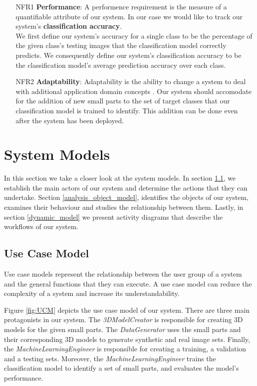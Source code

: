 \begin{itemize}
  \item [NFR1] \textbf{Performance}: A performence requirement is the measure of a quantifiable attribute of our system. In our case we would like to track our system's \textbf{classification accuracy}.
  \\We first define our system's accuracy for a single class to be the percentage of the given class's testing images that the classification model correctly predicts. We consequently define our system's classification accuracy to be the classification model's average prediction accuracy over each class.

  \item [NFR2] \textbf{Adaptability}: Adaptability is the ability to change a system to deal with additional application domain concepts \cite{bruegge2004object}. Our system should accomodate for the addition of new small parts to the set of target classes that our classification model is trained to identify. This addition can be done even after the system has been deployed.
\end{itemize}


\section{System Models}\label{system_models}

In this section we take a closer look at the system models. In section \ref{use_case_model}, we establish the main actors of our system and determine the actions that they can undertake. Section \ref{analysis_object_model}, identifies the objects of our system, examines their behaviour and studies the relationship between them. Lastly, in section \ref{dynamic_model} we present activity diagrams that describe the workflows of our system.

\subsection{Use Case Model}\label{use_case_model}
Use case models represent the relationship between the user group of a system and the general functions that they can execute. A use case model can reduce the complexity of a system and increase its understandability.

Figure \ref{fig:UCM} depicts the use case model of our system. There are three main protagonists in our system. The \textit{3DModelCreator} is responsible for creating 3D models for the given small parts. The \textit{DataGenerator} uses the small parts and their corresponding 3D models to generate synthetic and real image sets. Finally, the \textit{MachineLearningEngineer} is responsible for creating a training, a validation and a testing sets. Moreover, the \textit{MachineLearningEngineer} trains the classification model to identify a set of small parts, and evaluates the model's performance.

